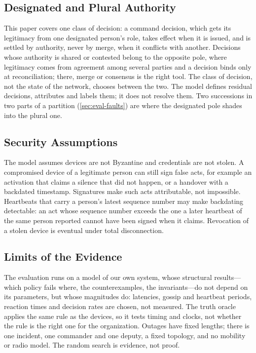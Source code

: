\subsection{Designated and Plural Authority}
\label{sec:thesis}

This paper covers one class of decision: a command decision, which gets its legitimacy
from one designated person's role, takes effect when it is issued, and is settled by
authority, never by merge, when it conflicts with another. Decisions whose authority is
shared or contested belong to the opposite pole, where legitimacy comes from agreement
among several parties and a decision binds only at reconciliation; there, merge or
consensus is the right tool. The class of decision, not the state of the network, chooses
between the two. The model defines residual decisions, attributes and labels them; it does
not resolve them. Two successions in two parts of a partition (\cref{sec:eval-faults}) are
where the designated pole shades into the plural one.

\subsection{Security Assumptions}

The model assumes devices are not Byzantine and credentials are not stolen. A compromised
device of a legitimate person can still sign false acts, for example an activation that
claims a silence that did not happen, or a handover with a backdated timestamp. Signatures
make such acts attributable, not impossible. Heartbeats that carry a person's latest
sequence number may make backdating detectable: an act whose sequence number exceeds the
one a later heartbeat of the same person reported cannot have been signed when it claims.
 Revocation of a
stolen device is eventual under total disconnection.

\subsection{Limits of the Evidence}
\label{sec:limits}

The evaluation runs on a model of our own system, whose structural results---which policy
fails where, the counterexamples, the invariants---do not depend on its parameters, but
whose magnitudes do: latencies, gossip and heartbeat periods, reaction times and decision
rates are chosen, not measured. The truth oracle applies the same rule as the devices, so
it tests timing and clocks, not whether the rule is the right one for the organization.
Outages have fixed lengths; there is one incident, one commander and one deputy, a fixed
topology, and no mobility or radio model. The random search is evidence, not proof.
